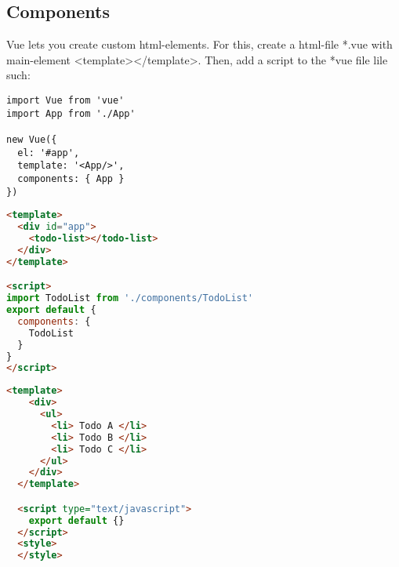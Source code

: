 \subsection{Components}

Vue lets you create custom html-elements.
For this, create a html-file *.vue with main-element <template></template>. Then, add a script to the *vue file lile such: 

\begin{lstlisting}[title=main.js]
import Vue from 'vue'
import App from './App'

new Vue({
  el: '#app',
  template: '<App/>',
  components: { App }
})
\end{lstlisting}

\begin{lstlisting}[language=html,title=App.vue]
<template>
  <div id="app">
    <todo-list></todo-list>
  </div>
</template>

<script>
import TodoList from './components/TodoList'
export default {
  components: {
    TodoList
  }
}
</script>
\end{lstlisting}

\begin{lstlisting}[language=html,title=TodoList.vue]
<template>
    <div>
      <ul>
        <li> Todo A </li>
        <li> Todo B </li>
        <li> Todo C </li>
      </ul>
    </div>
  </template>

  <script type="text/javascript">
    export default {}
  </script>
  <style>
  </style>

\end{lstlisting}